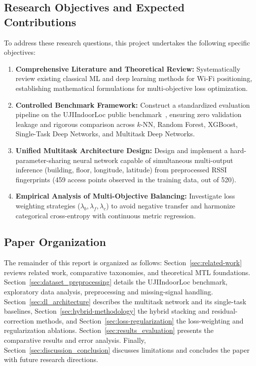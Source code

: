 \subsection{Research Objectives and Expected Contributions}
To address these research questions, this project undertakes the following specific objectives:
\begin{enumerate}
    \item \textbf{Comprehensive Literature and Theoretical Review:} Systematically review existing classical ML and deep learning methods for Wi-Fi positioning, establishing mathematical formulations for multi-objective loss optimization.
    \item \textbf{Controlled Benchmark Framework:} Construct a standardized evaluation pipeline on the UJIIndoorLoc public benchmark~\cite{torres2014ujiindoorloc}, ensuring zero validation leakage and rigorous comparison across $k$-NN, Random Forest, XGBoost, Single-Task Deep Networks, and Multitask Deep Networks.
    \item \textbf{Unified Multitask Architecture Design:} Design and implement a hard-parameter-sharing neural network capable of simultaneous multi-output inference (building, floor, longitude, latitude) from preprocessed RSSI fingerprints (459 access points observed in the training data, out of 520).
    \item \textbf{Empirical Analysis of Multi-Objective Balancing:} Investigate loss weighting strategies ($\lambda_b, \lambda_f, \lambda_c$) to avoid negative transfer and harmonize categorical cross-entropy with continuous metric regression.
\end{enumerate}

\subsection{Paper Organization}
The remainder of this report is organized as follows: Section~\ref{sec:related-work} reviews related work, comparative taxonomies, and theoretical MTL foundations. Section~\ref{sec:dataset_preprocessing} details the UJIIndoorLoc benchmark, exploratory data analysis, preprocessing and missing-signal handling. Section~\ref{sec:dl_architecture} describes the multitask network and its single-task baselines, Section~\ref{sec:hybrid-methodology} the hybrid stacking and residual-correction methods, and Section~\ref{sec:loss-regularization} the loss-weighting and regularization ablations. Section~\ref{sec:results_evaluation} presents the comparative results and error analysis. Finally, Section~\ref{sec:discussion_conclusion} discusses limitations and concludes the paper with future research directions.
